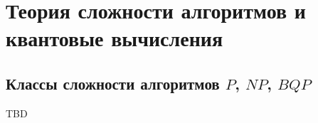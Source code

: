 \section{Теория сложности алгоритмов и квантовые вычисления}

\subsection{Классы сложности алгоритмов $P$, $NP$, $BQP$ }

TBD
